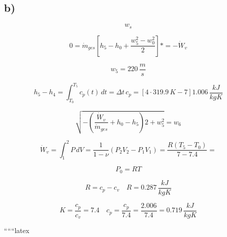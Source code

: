 

\subsection*{b)}

\[
w_s
\]

\[
0 = \dot{m}_{ges} \left[ h_5 - h_0 + \frac{w_5^2 - w_0^2}{2} \right] * = -\dot{W}_v
\]

\[
w_5 = 220 \, \frac{m}{s}
\]

\[
h_5 - h_4 = \int_{T_0}^{T_5} c_p(t) \, dt = \Delta t \, c_p = \left[ 4 \cdot 319.9 \, K - 7 \right] 1.006 \, \frac{kJ}{kgK}
\]

\[
\sqrt{-\left( \frac{\dot{W}_v}{\dot{m}_{ges}} + h_0 - h_5 \right) 2 + w_5^2} = w_6
\]

\[
\dot{W}_v = \int_1^2 P \, dV = \frac{1}{1 - \nu} \left( P_2 V_2 - P_1 V_1 \right) = \frac{R \left( T_5 - T_0 \right)}{7 - 7.4} =
\]

\[
P_0 = RT
\]

\[
R = c_p - c_v \quad R = 0.287 \, \frac{kJ}{kgK}
\]

\[
K = \frac{c_p}{c_v} = 7.4 \quad c_p = \frac{c_p}{7.4} = \frac{2.006}{7.4} = 0.719 \, \frac{kJ}{kgK}
\]

``````latex